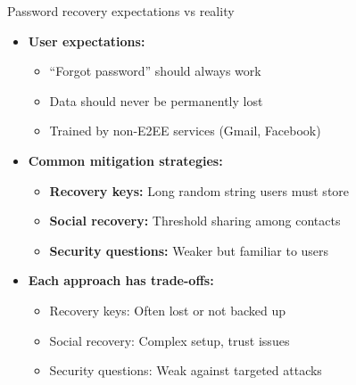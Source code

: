 \documentclass[aspectratio=169, lualatex, handout]{beamer}
\begin{document}
\begin{frame}{Password recovery expectations vs reality}
	\begin{itemize}
		\item \textbf{User expectations:}
		      \begin{itemize}
			      \item ``Forgot password'' should always work
			      \item Data should never be permanently lost
			      \item Trained by non-E2EE services (Gmail, Facebook)
		      \end{itemize}
		\item \textbf{Common mitigation strategies:}
		      \begin{itemize}
			      \item \textbf{Recovery keys:} Long random string users must store
			      \item \textbf{Social recovery:} Threshold sharing among contacts
			      \item \textbf{Security questions:} Weaker but familiar to users
		      \end{itemize}
		\item \textbf{Each approach has trade-offs:}
		      \begin{itemize}
			      \item Recovery keys: Often lost or not backed up
			      \item Social recovery: Complex setup, trust issues
			      \item Security questions: Weak against targeted attacks
		      \end{itemize}
	\end{itemize}
\end{frame}
\end{document}
